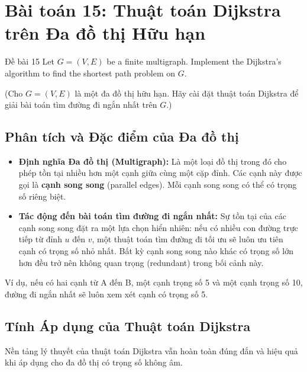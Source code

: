 \documentclass[a4paper,12pt]{article}
\begin{document}
\newpage


\section{Bài toán 15: Thuật toán Dijkstra trên Đa đồ thị Hữu hạn}

\begin{problembox}{Đề bài 15}
    Let $G = (V,E)$ be a finite multigraph. Implement the Dijkstra's algorithm to find the shortest path problem on $G$.
    
    (Cho $G = (V,E)$ là một đa đồ thị hữu hạn. Hãy cài đặt thuật toán Dijkstra để giải bài toán tìm đường đi ngắn nhất trên $G$.)
\end{problembox}

\subsection{Phân tích và Đặc điểm của Đa đồ thị}
\begin{itemize}
    \item \textbf{Định nghĩa Đa đồ thị (Multigraph):} Là một loại đồ thị trong đó cho phép tồn tại nhiều hơn một cạnh giữa cùng một cặp đỉnh. Các cạnh này được gọi là \textbf{cạnh song song} (parallel edges). Mỗi cạnh song song có thể có trọng số riêng biệt.
    
    \item \textbf{Tác động đến bài toán tìm đường đi ngắn nhất:} Sự tồn tại của các cạnh song song đặt ra một lựa chọn hiển nhiên: nếu có nhiều con đường trực tiếp từ đỉnh $u$ đến $v$, một thuật toán tìm đường đi tối ưu sẽ luôn ưu tiên cạnh có trọng số nhỏ nhất. Bất kỳ cạnh song song nào khác có trọng số lớn hơn đều trở nên không quan trọng (redundant) trong bối cảnh này.
\end{itemize}
Ví dụ, nếu có hai cạnh từ A đến B, một cạnh trọng số 5 và một cạnh trọng số 10, đường đi ngắn nhất sẽ luôn xem xét cạnh có trọng số 5.

\subsection{Tính Áp dụng của Thuật toán Dijkstra}
Nền tảng lý thuyết của thuật toán Dijkstra vẫn hoàn toàn đúng đắn và hiệu quả khi áp dụng cho đa đồ thị có trọng số không âm.
\end{document}
